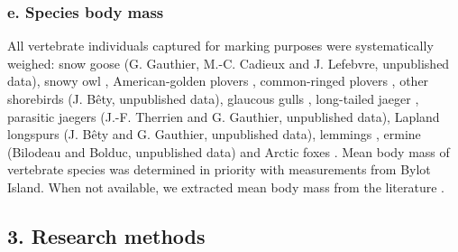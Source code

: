 \documentclass[a4paper,twoside,12pt]{article}
\begin{document}
\subsubsection*{e. Species body mass}
All vertebrate individuals captured for marking purposes were systematically weighed: snow goose (G. Gauthier, M.-C. Cadieux and J. Lefebvre, unpublished data), snowy owl \citep{therrien2012, robillard2018}, American-golden plovers \citep{lamarre2021}, common-ringed plovers \citep{leandri2019}, other shorebirds (J. Bêty, unpublished data), glaucous gulls \citep{gauthier2015}, long-tailed jaeger \citep{seyer2019}, parasitic jaegers (J.-F. Therrien and G. Gauthier, unpublished data), Lapland longspurs (J. Bêty and G. Gauthier, unpublished data), lemmings \citep{gauthier2020lemmings}, ermine (Bilodeau and Bolduc, unpublished data) and Arctic foxes \citep{lai2015}. Mean body mass of vertebrate species was determined in priority with measurements from Bylot Island. When not available, we extracted mean body mass from the literature \citep{wilman2014}.
\newpage
                        
    \subsection*{3.  Research methods}
\end{document}
